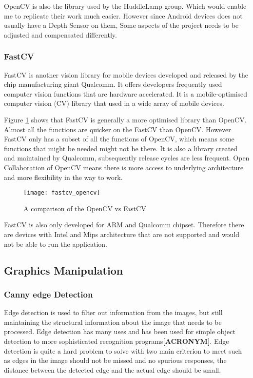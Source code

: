 OpenCV is also the library used by the HuddleLamp group. Which would enable me to replicate their work much easier. However since Android devices does not usually have a Depth Sensor on them, Some aspects of the project needs to be adjusted and compensated differently.

\subsubsection{FastCV}
FastCV is another vision library for mobile devices developed and released by the chip manufacturing giant Qualcomm\cite{fastcv}. It offers developers frequently used computer vision functions that are hardware accelerated. It is a mobile-optimised computer vision (CV) library that used in a wide array of mobile devices.

Figure \ref{opencv_fastcv} shows that FastCV is generally a more optimised library than OpenCV. Almost all the functions are quicker on the FastCV than OpenCV. However FastCV only has a subset of all the functions of OpenCV, which means some functions that might be needed might not be there. It is also a library created and maintained by Qualcomm, subsequently release cycles are less frequent. Open Collaboration of OpenCV means there is more access to underlying architecture and more flexibility in the way to work. 

\begin{figure}[h]
    \centering
    \texttt{[image: fastcv\_opencv]}
    \caption{A comparison of the OpenCV vs FastCV \cite{fastcv_opencv}}
    \label{opencv_fastcv}
\end{figure}

FastCV is also only developed for ARM and Qualcomm chipset. Therefore there are devices with Intel and Mips architecture that are not supported and would not be able to run the application.

\subsection{Graphics Manipulation}
\subsubsection{Canny edge Detection}
Edge detection is used to filter out information from the images, but still maintaining the structural information about the image that needs to be processed. Edge detection has many uses and has been used for simple object detection to more sophisticated recognition programs\textbf{[ACRONYM]}. Edge detection is quite a hard problem to solve with two main criterion to meet such as edges in the image should not be missed and no spurious responses, the distance between the detected edge and the actual edge should be small\cite{canny-paper}.


